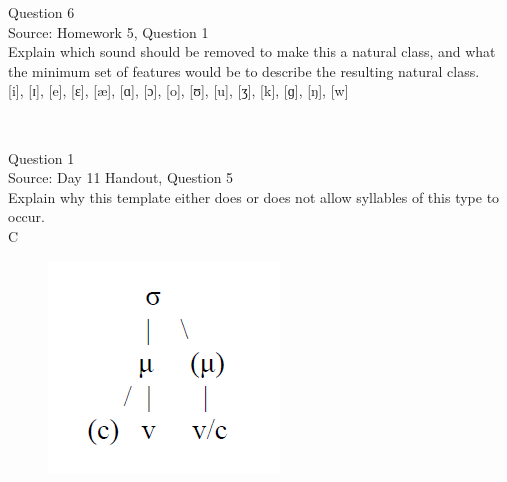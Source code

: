 \documentclass[12pt]{article}
\begin{document}
\newpage

{\large Question 6}\\

Source: Homework 5, Question 1\\

Explain which sound should be removed to make this a natural class, and what the minimum set of features would be to describe the resulting natural class.\\

{[i]}, {[ɪ]}, {[e]}, {[ɛ]}, {[æ]}, {[ɑ]}, {[ɔ]}, {[o]}, {[ʊ]}, {[u]}, {[ʒ]}, {[k]}, {[ɡ]}, {[ŋ]}, {[w]}


\newpage

\begin{center}
\textbf{{\color{red}{\HUGE END OF EXAM}}}\\

\end{center}
\newpage

\begin{center}
\textbf{{\color{blue}{\HUGE START OF EXAM\\}}}

\textbf{{\color{blue}{\HUGE Student ID: 3419\\}}}

\textbf{{\color{blue}{\HUGE 5:20 - 5:40 PM\\}}}

\end{center}
\newpage

{\large Question 1}\\

Source: Day 11 Handout, Question 5\\

Explain why this template either does or does not allow syllables of this type to occur.\\

C

\begin{figure}[H]
\includegraphics{../images/ponapean_syllabletemplate.png}
\end{figure}
\end{document}
